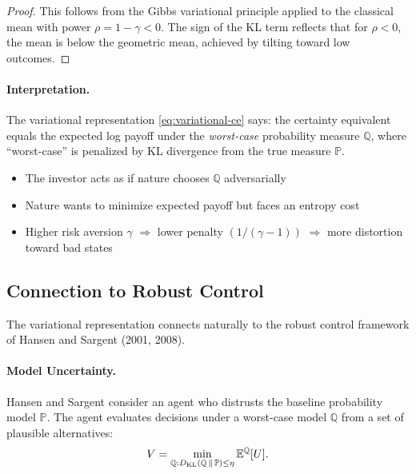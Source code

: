 \begin{proof}
This follows from the Gibbs variational principle applied to the classical mean with power $\rho = 1 - \gamma < 0$. The sign of the KL term reflects that for $\rho < 0$, the mean is below the geometric mean, achieved by tilting toward low outcomes.
\end{proof}

\paragraph{Interpretation.}

The variational representation \eqref{eq:variational-ce} says: the certainty equivalent equals the expected log payoff under the \emph{worst-case} probability measure $\mathbb{Q}$, where ``worst-case'' is penalized by KL divergence from the true measure $\mathbb{P}$.

\begin{itemize}[nosep]
    \item The investor acts as if nature chooses $\mathbb{Q}$ adversarially
    \item Nature wants to minimize expected payoff but faces an entropy cost
    \item Higher risk aversion $\gamma$ $\Rightarrow$ lower penalty $(1/(\gamma-1))$ $\Rightarrow$ more distortion toward bad states
\end{itemize}

\subsection{Connection to Robust Control}
\label{subsec:robust-control}

The variational representation connects naturally to the robust control framework of Hansen and Sargent (2001, 2008).

\paragraph{Model Uncertainty.}

Hansen and Sargent consider an agent who distrusts the baseline probability model $\mathbb{P}$. The agent evaluates decisions under a worst-case model $\mathbb{Q}$ from a set of plausible alternatives:
\begin{equation}
V = \min_{\mathbb{Q}: D_{\mathrm{KL}}\left(\mathbb{Q} \,\|\, \mathbb{P}\right) \leq \eta} \mathbb{E}^{\mathbb{Q}}[U].
\label{eq:robust-minmax}
\end{equation}

